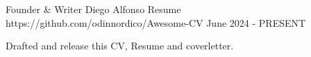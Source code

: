 

\begin{cventries}

  \cventry
    {Founder \& Writer} %
    {Diego Alfonso Resume} %
    {https://github.com/odinnordico/Awesome-CV} %
    {June 2024 - PRESENT} %
    {
      \begin{cvitems} %
        \item {Drafted and release this CV, Resume and coverletter.}
      \end{cvitems}
    }

\end{cventries}
